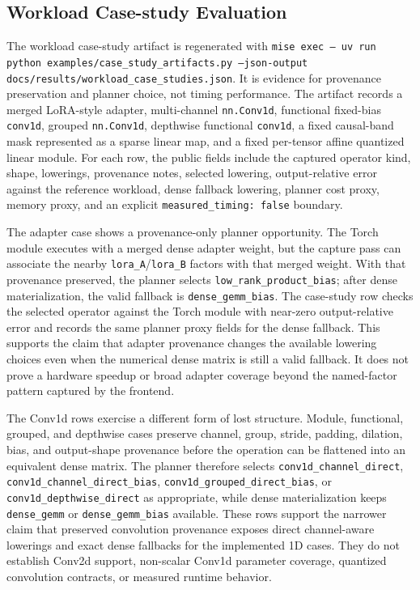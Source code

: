 \documentclass[11pt]{article}
\begin{document}
\subsection{Workload Case-study Evaluation}

The workload case-study artifact is regenerated with \texttt{mise exec -- uv
run python examples/case\_study\_artifacts.py --json-output
docs/results/workload\_case\_studies.json}. It is evidence for provenance
preservation and planner choice, not timing performance. The artifact records a
merged LoRA-style adapter, multi-channel \texttt{nn.Conv1d}, functional
fixed-bias \texttt{conv1d}, grouped \texttt{nn.Conv1d}, depthwise functional
\texttt{conv1d}, a fixed causal-band mask represented as a sparse linear map,
and a fixed per-tensor affine quantized linear module. For each row, the public
fields include the captured operator kind, shape, lowerings, provenance notes,
selected lowering, output-relative error against the reference workload, dense
fallback lowering, planner cost proxy, memory proxy, and an explicit
\texttt{measured\_timing: false} boundary.

The adapter case shows a provenance-only planner opportunity. The Torch module
executes with a merged dense adapter weight, but the capture pass can associate
the nearby \texttt{lora\_A}/\texttt{lora\_B} factors with that merged weight.
With that provenance preserved, the planner selects
\texttt{low\_rank\_product\_bias}; after dense materialization, the valid
fallback is \texttt{dense\_gemm\_bias}. The case-study row checks the selected
operator against the Torch module with near-zero output-relative error and
records the same planner proxy fields for the dense fallback. This supports the
claim that adapter provenance changes the available lowering choices even when
the numerical dense matrix is still a valid fallback. It does not prove a
hardware speedup or broad adapter coverage beyond the named-factor pattern
captured by the frontend.

The Conv1d rows exercise a different form of lost structure. Module,
functional, grouped, and depthwise cases preserve channel, group, stride,
padding, dilation, bias, and output-shape provenance before the operation can
be flattened into an equivalent dense matrix. The planner therefore selects
\texttt{conv1d\_channel\_direct},
\texttt{conv1d\_channel\_direct\_bias},
\texttt{conv1d\_grouped\_direct\_bias}, or
\texttt{conv1d\_depthwise\_direct} as appropriate, while dense materialization
keeps \texttt{dense\_gemm} or \texttt{dense\_gemm\_bias} available. These rows
support the narrower claim that preserved convolution provenance exposes
direct channel-aware lowerings and exact dense fallbacks for the implemented
1D cases. They do not establish Conv2d support, non-scalar Conv1d parameter
coverage, quantized convolution contracts, or measured runtime behavior.
\end{document}
